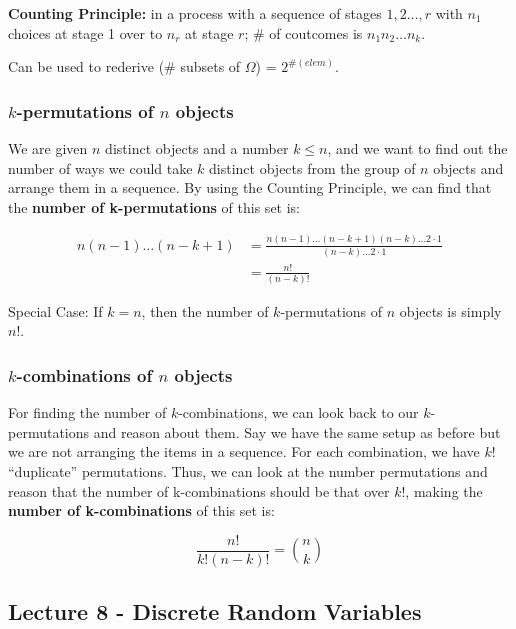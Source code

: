 \documentclass{article}
\begin{document}
\textbf{Counting Principle:} in a process with a sequence of stages
$1, 2 \dots, r$ with $n_1$ choices at stage 1 over to $n_r$ at stage
$r$; \# of coutcomes is $n_1 n_2 \dots n_k$.

Can be used to rederive (\# subsets of $\Omega$) = $2^{\#(elem)}$.

\bigskip
\subsubsection{$k$-permutations of $n$ objects}

We are given $n$ distinct objects and a number $k \leq n$, and we want
to find out the number of ways we could take $k$ distinct objects from
the group of $n$ objects and arrange them in a sequence. By using the
Counting Principle, we can find that the \textbf{number of
  k-permutations} of this set is:

\begin{equation}
  \tag{K-permutations}
  \boxed{
    \begin{aligned}
      n (n-1) \dots (n-k+1)
      &= \frac{n (n-1) \dots (n-k+1) (n-k) \dots 2 \cdot 1}{(n-k)
        \dots 2 \cdot 1} \\
      &= \frac{n!}{(n-k)!}
    \end{aligned}
  }
\end{equation}

Special Case: If $k = n$, then the number of $k$-permutations of $n$
objects is simply $n!$.

\bigskip
\subsubsection{$k$-combinations of $n$ objects}

For finding the number of $k$-combinations, we can look back to our
$k$-permutations and reason about them. Say we have the same setup as
before but we are not arranging the items in a sequence. For each
combination, we have $k!$ ``duplicate'' permutations. Thus, we can
look at the number permutations and reason that the number of
k-combinations should be that over $k!$, making the \textbf{number of
  k-combinations} of this set is:

\begin{equation}
  \tag{K-combinations}
  \boxed{
    \frac{n!}{k!(n-k)!} = \binom{n}{k}
  }
\end{equation}


\subsection{Lecture 8 - Discrete Random Variables}
\end{document}

